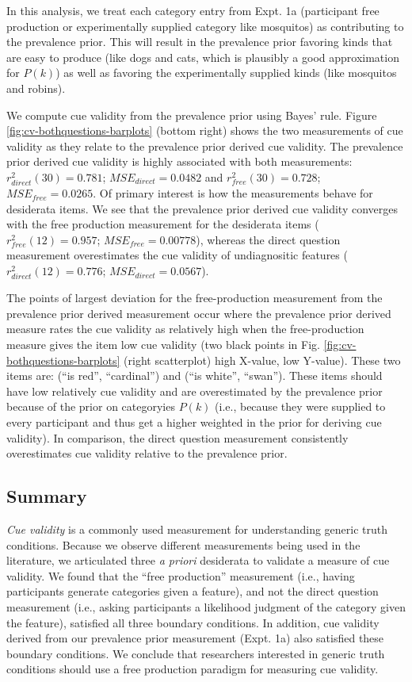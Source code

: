 \documentclass[english,floatsintext,man]{apa6}
\theoremstyle{definition}
\theoremstyle{definition}
\theoremstyle{definition}
\theoremstyle{remark}
\begin{document}
In this analysis, we treat each category entry from Expt. 1a
(participant free production or experimentally supplied category like
mosquitos) as contributing to the prevalence prior. This will result in
the prevalence prior favoring kinds that are easy to produce (like dogs
and cats, which is plausibly a good approximation for \(P(k)\)) as well
as favoring the experimentally supplied kinds (like mosquitos and
robins).

We compute cue validity from the prevalence prior using Bayes' rule.
Figure \ref{fig:cv-bothquestions-barplots} (bottom right) shows the two
measurements of cue validity as they relate to the prevalence prior
derived cue validity. The prevalence prior derived cue validity is
highly associated with both measurements: \(r_{direct}^2(30) = 0.781\);
\(MSE_{direct} = 0.0482\) and \(r_{free}^2(30) = 0.728\);
\(MSE_{free} = 0.0265\). Of primary interest is how the measurements
behave for desiderata items. We see that the prevalence prior derived
cue validity converges with the free production measurement for the
desiderata items (\(r_{free}^2(12) = 0.957\); \(MSE_{free} = 0.00778\)),
whereas the direct question measurement overestimates the cue validity
of undiagnositic features (\(r_{direct}^2(12) = 0.776\);
\(MSE_{direct} = 0.0567\)).

The points of largest deviation for the free-production measurement from
the prevalence prior derived measurement occur where the prevalence
prior derived measure rates the cue validity as relatively high when the
free-production measure gives the item low cue validity (two black
points in Fig. \ref{fig:cv-bothquestions-barplots} (right scatterplot)
high X-value, low Y-value). These two items are: (\enquote{is red},
\enquote{cardinal}) and (\enquote{is white}, \enquote{swan}). These
items should have low relatively cue validity and are overestimated by
the prevalence prior because of the prior on categoryies \(P(k)\) (i.e.,
because they were supplied to every participant and thus get a higher
weighted in the prior for deriving cue validity). In comparison, the
direct question measurement consistently overestimates cue validity
relative to the prevalence prior.

\subsection{Summary}\label{summary}

\emph{Cue validity} is a commonly used measurement for understanding
generic truth conditions. Because we observe different measurements
being used in the literature, we articulated three \emph{a priori}
desiderata to validate a measure of cue validity. We found that the
\enquote{free production} measurement (i.e., having participants
generate categories given a feature), and not the direct question
measurement (i.e., asking participants a likelihood judgment of the
category given the feature), satisfied all three boundary conditions. In
addition, cue validity derived from our prevalence prior measurement
(Expt. 1a) also satisfied these boundary conditions. We conclude that
researchers interested in generic truth conditions should use a free
production paradigm for measuring cue validity.
\end{document}
